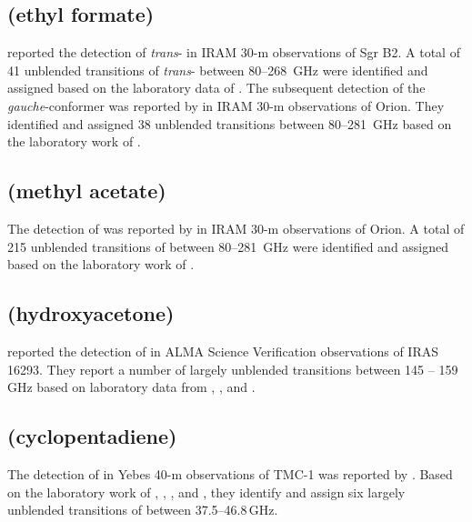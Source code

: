 \documentclass[twocolumn]{aastex631}
\newcommand{\update}[1]{{#1}}
\begin{document}
	\subsection{ (ethyl formate)}
	\label{CH3CH2OCHO}
	
	\citet{Belloche:2009ki} reported the detection of \emph{trans}- in IRAM 30-m observations of Sgr B2.  A total of 41 unblended transitions of \emph{trans}- between 80--268~GHz were identified and assigned based on the laboratory data of \citet{Medvedev:2009fs}.  The subsequent detection of the \emph{gauche}-conformer was reported by \citet{Tercero:2013fz} in IRAM 30-m observations of Orion.  They identified and assigned 38 unblended transitions between 80--281~GHz based on the laboratory work of \citet{Demaison:1984if}.
	
	\subsection{ (methyl acetate)}
	\label{CH3COOCH3}
	
	The detection of  was reported by \citet{Tercero:2013fz} in IRAM 30-m observations of Orion.  A total of 215 unblended transitions of  between 80--281~GHz were identified and assigned based on the laboratory work of \citet{Tudorie:2011br}.
	
	\subsection{\update{ (hydroxyacetone)}}
	\label{CH3COCH2OH}
	
	\update{\citet{Zhou:2020br} reported the detection of \ce{CH3COCH2OH} in ALMA Science Verification observations of IRAS 16293.  They report a number of largely unblended transitions between 145 -- 159\,GHz based on laboratory data from \citet{Katija:1980pd}, \citet{Apponi:2006il}, and \citet{Braakman:2010cv}.}
	
	\subsection{\update{ (cyclopentadiene)}}
	\label{cyclopentadiene}
	
	\update{The detection of  in Yebes 40-m observations of TMC-1 was reported by \citet{2021A&A...649L..15C}.  Based on the laboratory work of \citet{1956JChPh..24..635L}, \citet{1965JChPh..43.2765S}, \citet{Benson:1970ur}, and \citet{1988JMoSp.132..277B}, they identify and assign six largely unblended transitions of \ce{C5H6} between 37.5--46.8\,GHz.}
	
\end{document}
